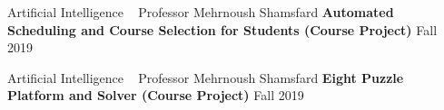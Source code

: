   \begin{cventries}

    \cventry
    {Artificial Intelligence ~ Professor Mehrnoush Shamsfard}
    {\textbf {Automated Scheduling and Course Selection for Students (Course Project)}}
    {}
    {Fall 2019}
    {}
    \vspace{0.0 cm}
  \end{cventries}
  \begin{cventries}

    \cventry
    {Artificial Intelligence ~ Professor Mehrnoush Shamsfard}
    {\textbf {Eight Puzzle Platform and Solver (Course Project)}}
    {}
    {Fall 2019}
    {}
    
\end{cventries}